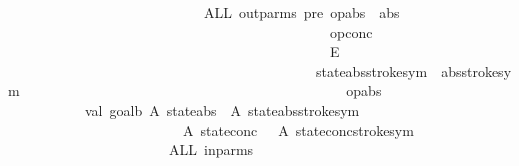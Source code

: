 \begin{isabellebody}
\ \ \ \ \ \ \ \ \ \ \ \ \ \ \ \ \ \ \ \ \ \ \ \ \ \ \ \ {\isacharparenleft}ALL\ out{\isacharunderscore}parms\ {\isacharparenleft}{\isachardoublequote}pre\ {\isachardoublequote}{\isacharcircum}op{\isacharunderscore}abs{\isacharcircum}{\isachardoublequote}\ {\isasymand}\ {\isachardoublequote}{\isacharcircum}abs{\isacharcircum}\isanewline
\ \ \ \ \ \ \ \ \ \ \ \ \ \ \ \ \ \ \ \ \ \ \ \ \ \ \ \ \ \ \ \ \ \ \ \ \ \ \ \ \ \ \ \ {\isachardoublequote}\ {\isasymand}\ {\isachardoublequote}{\isacharcircum}op{\isacharunderscore}conc{\isacharcircum}\ \isanewline
\ \ \ \ \ \ \ \ \ \ \ \ \ \ \ \ \ \ \ \ \ \ \ \ \ \ \ \ \ \ \ \ \ \ \ \ \ \ \ \ \ \ \ \ {\isachardoublequote}\ {\isasymlongrightarrow}\ {\isacharparenleft}{\isacharpercent}E\ {\isachardoublequote}\isanewline
\ \ \ \ \ \ \ \ \ \ \ \ \ \ \ \ \ \ \ \ \ \ \ \ \ \ \ \ \ \ \ \ \ \ \ \ \ \ \ \ \ \ \ \ {\isacharcircum}state{\isacharunderscore}abs{\isacharcircum}stroke{\isacharunderscore}sym{\isacharcircum}{\isachardoublequote}\ {\isacharat}\ {\isachardoublequote}{\isacharcircum}abs{\isacharcircum}stroke{\isacharunderscore}sym{\isacharcircum}\isanewline
\ \ \ \ \ \ \ \ \ \ \ \ \ \ \ \ \ \ \ \ \ \ \ \ \ \ \ \ \ \ \ \ \ \ \ \ \ \ \ \ \ \ \ \ {\isachardoublequote}\ {\isasymand}\ {\isachardoublequote}{\isacharcircum}op{\isacharunderscore}abs{\isacharcircum}{\isachardoublequote}{\isacharparenright}{\isachardoublequote}{\isacharparenright}{\isacharparenright}{\isacharparenright}{\isacharcircum}{\isachardoublequote}{\isacharparenright}{\isacharparenright}{\isachardoublequote}\isanewline
\ \ \ \ \ \ \ \ \ \ \ val\ goal{}b{\isacharequal}\ {\isachardoublequote}{\isacharpercent}A\ {\isachardoublequote}{\isacharcircum}state{\isacharunderscore}abs{\isacharcircum}{\isachardoublequote}\ {\isacharat}\ {\isacharparenleft}{\isacharpercent}A\ {\isachardoublequote}{\isacharcircum}state{\isacharunderscore}abs{\isacharcircum}stroke{\isacharunderscore}sym{\isacharcircum}\isanewline
\ \ \ \ \ \ \ \ \ \ \ \ \ \ \ \ \ \ \ \ \ \ \ {\isachardoublequote}\ {\isacharat}\ {\isacharparenleft}{\isacharpercent}A\ {\isachardoublequote}{\isacharcircum}state{\isacharunderscore}conc{\isacharcircum}{\isachardoublequote}\ {\isacharat}\ {\isachardoublequote}{\isacharcircum}\ {\isachardoublequote}{\isacharparenleft}{\isacharpercent}A\ {\isachardoublequote}{\isacharcircum}state{\isacharunderscore}conc{\isacharcircum}stroke{\isacharunderscore}sym{\isacharcircum}{\isachardoublequote}\ {\isacharat}\ {\isachardoublequote}{\isacharcircum}\isanewline
\ \ \ \ \ \ \ \ \ \ \ \ \ \ \ \ \ \ \ \ \ \ \ {\isacharparenleft}ALL\ in{\isacharunderscore}parms\ \ \ \ \ \ \ \ \ \ \ \ \ \ \ \ \ \ \ \ \ \ \ \isanewline

\end{isabellebody}
